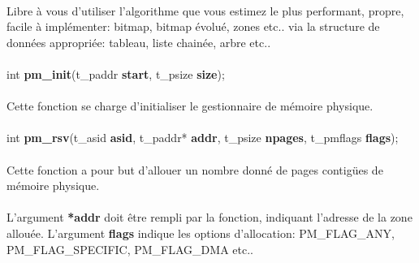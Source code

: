 \documentclass[10pt,a4wide]{article}
\begin{document}
\paragraph{}

Libre \`a vous d'utiliser l'algorithme que vous estimez le plus performant,
propre, facile \`a impl\'ementer: bitmap, bitmap \'evolu\'e, zones etc.. via
la structure de donn\'ees appropri\'ee: tableau, liste chain\'ee, arbre etc..

\paragraph{}

\hspace{1.5cm}int \textbf{pm\_init}(t\_paddr \textbf{start},
                                    t\_psize \textbf{size});

\paragraph{}

Cette fonction se charge d'initialiser le gestionnaire de m\'emoire physique.

\paragraph{}

\hspace{1.5cm}int \textbf{pm\_rsv}(t\_asid \textbf{asid},
                                   t\_paddr* \textbf{addr},
                                   t\_psize \textbf{npages},
                                   t\_pmflags \textbf{flags});

\paragraph{}

Cette fonction a pour but d'allouer un nombre donn\'e de pages contig\"ues
de m\'emoire physique.

\paragraph{}

L'argument \textbf{*addr} doit \^etre rempli par la fonction, indiquant
l'adresse de la zone allou\'ee. L'argument \textbf{flags} indique les options
d'allocation: PM\_FLAG\_ANY, PM\_FLAG\_SPECIFIC, PM\_FLAG\_DMA etc..
\end{document}
